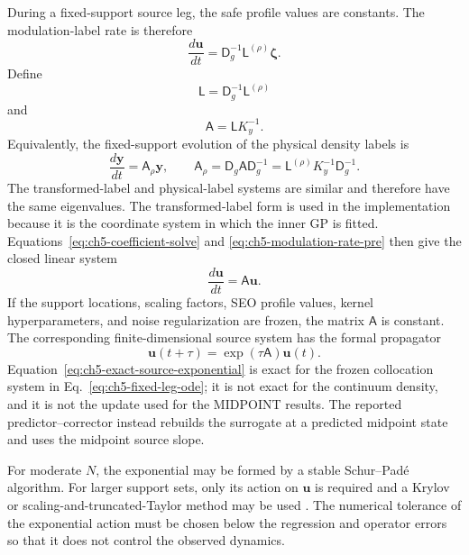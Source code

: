 \documentclass[
  11pt,
  letterpaper,
  onehalfspacing,
  normalmargins,
  equalmargins,
  oneside
]{ut-thesis}
\begin{document}
During a fixed-support source leg, the safe profile values are constants. The
modulation-label rate is therefore
\begin{equation}
\frac{d\mathbf u}{dt}
=
\mathsf D_g^{-1}\mathsf L^{(\rho)}\boldsymbol\zeta.
\label{eq:ch5-modulation-rate-pre}
\end{equation}
Define
\begin{equation}
\mathsf L
=
\mathsf D_g^{-1}\mathsf L^{(\rho)}
\label{eq:ch5-modulation-operator-matrix}
\end{equation}
and
\begin{equation}
\mathsf A
=
\mathsf L K_y^{-1}.
\label{eq:ch5-leg-generator}
\end{equation}
Equivalently, the fixed-support evolution of the physical density labels is
\begin{equation}
\frac{d\mathbf y}{dt}
=
\mathsf A_{\rho}\mathbf y,
\qquad
\mathsf A_{\rho}
=
\mathsf D_g \mathsf A \mathsf D_g^{-1}
=
\mathsf L^{(\rho)}K_y^{-1}\mathsf D_g^{-1}.
\label{eq:ch5-physical-label-generator}
\end{equation}
The transformed-label and physical-label systems are similar and therefore
have the same eigenvalues. The transformed-label form is used in the
implementation because it is the coordinate system in which the inner GP is
fitted.
Equations~\eqref{eq:ch5-coefficient-solve} and
\eqref{eq:ch5-modulation-rate-pre} then give the closed linear system
\begin{equation}
\frac{d\mathbf u}{dt}
=
\mathsf A\mathbf u.
\label{eq:ch5-fixed-leg-ode}
\end{equation}
If the support locations, scaling factors, SEO profile values, kernel
hyperparameters, and noise regularization are frozen, the matrix \(\mathsf A\)
is constant. The corresponding finite-dimensional source system has the
formal propagator
\begin{equation}
\mathbf u(t+\tau)
=
\exp(\tau\mathsf A)\mathbf u(t).
\label{eq:ch5-exact-source-exponential}
\end{equation}
Equation~\eqref{eq:ch5-exact-source-exponential} is exact for the frozen
collocation system in Eq.~\eqref{eq:ch5-fixed-leg-ode}; it is not exact for
the continuum density, and it is not the update used for the MIDPOINT results.
The reported predictor--corrector instead rebuilds the surrogate at a predicted
midpoint state and uses the midpoint source slope.

For moderate \(N\), the exponential may be formed by a stable Schur--Pad\'e
algorithm. For larger support sets, only its action on \(\mathbf u\) is
required and a Krylov or scaling-and-truncated-Taylor method may be used
\cite{Higham2008Functions,AlMohyHigham2011}. The numerical tolerance of the
exponential action must be chosen below the regression and operator errors so
that it does not control the observed dynamics.
\end{document}
